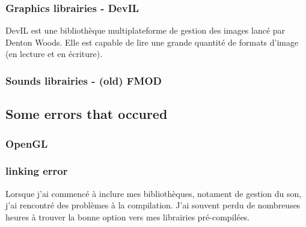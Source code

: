 \documentclass[12pt]{article}
\begin{document}
\subsubsection{Graphics librairies - DevIL}

DevIL est une bibliothèque multiplateforme de gestion des images lancé par Denton Woods. Elle est capable de lire une grande quantité de formats d'image (en lecture et en écriture).

\newpage
\subsubsection{Sounds librairies - (old) FMOD}

\subsection{Some errors that occured}
\subsubsection{OpenGL}

\subsubsection{linking error}
Lorsque j'ai commencé à inclure mes bibliothèques, notament de gestion du son, j'ai rencontré des problèmes à la compilation. J'ai souvent perdu de nombreuses heures à trouver la bonne option vers mes librairies pré-compilées.
\end{document}
